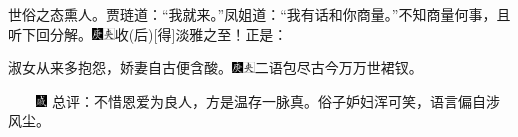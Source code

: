 {世俗之态熏人。}贾琏道：“我就来。”凤姐道：“我有话和你商量。”不知商量何事，且听下回分解。{\includegraphics[width=3mm]{../Images/00004}\includegraphics[width=3mm]{../Images/00012}\footnotesize \kaishu 收{(后)}{[}得{]}淡雅之至！}正是：

淑女从来多抱怨，娇妻自古便含酸。{\includegraphics[width=3mm]{../Images/00004}\includegraphics[width=3mm]{../Images/00012}\footnotesize \kaishu 二语包尽古今万万世裙钗。}

{　　\includegraphics[width=3mm]{../Images/00005}  \kaishu 总评：不惜恩爱为良人，方是温存一脉真。俗子妒妇浑可笑，语言偏自涉风尘。}


